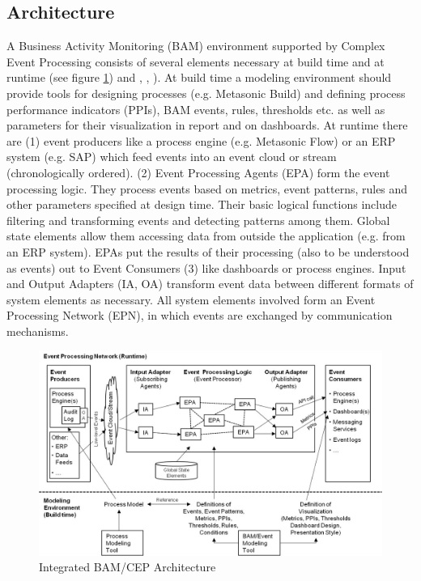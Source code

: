 \subsection{Architecture }  
A Business Activity Monitoring (BAM) environment supported by Complex Event Processing consists of several elements necessary at build time and at runtime (see figure \ref{fig:BAMArchitecture}) and \cite{book:processmonitoring}, \cite{book:CEPinAction} , \cite{article:BlueprintEventBPM}). At build time a modeling environment should provide tools for designing processes (e.g. Metasonic Build) and defining process performance indicators (PPIs), BAM events, rules, thresholds etc. as well as parameters for their visualization in report and on dashboards. At runtime there are (1) event producers like a process engine (e.g. Metasonic Flow) or an ERP system (e.g. SAP) which feed events into an event cloud or stream (chronologically ordered). (2) Event Processing Agents (EPA) form the event processing logic. They process events based on metrics, event patterns, rules and other parameters specified at design time. Their basic logical functions include filtering and transforming events and detecting patterns among them. Global state elements allow them accessing data from outside the application (e.g. from an ERP system). EPAs put the results of their processing (also to be understood as events) out to Event Consumers (3) like dashboards or process engines. Input and Output Adapters (IA, OA) transform event data between different formats of system elements as necessary. All system elements involved form an Event Processing Network (EPN), in which events are exchanged by communication mechanisms.

\begin{figure}[h]
	\centering
	\includegraphics[width=0.9\linewidth]{Figures/Chapter5/Monitoring/Integrated-BAM-CEP-Architecture-27.jpg}
	\caption[Integrated BAM/CEP Architecture 27]{Integrated BAM/CEP Architecture \cite{book:processmonitoring}}
	\label{fig:BAMArchitecture}
\end{figure}



